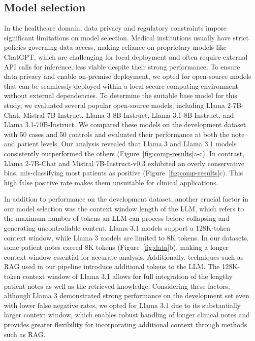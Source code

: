 \documentclass[fleqn,10pt]{wlscirep}
\begin{document}
\subsection*{Model selection}

In the healthcare domain, data privacy and regulatory constraints impose significant limitations on model selection. Medical institutions usually have strict policies governing data access, making reliance on proprietary models like ChatGPT, which are challenging for local deployment and often require external API calls for inference, less viable despite their strong performance. To ensure data privacy and enable on-premise deployment, we opted for open-source models that can be seamlessly deployed within a local secure computing environment without external dependencies. To determine the suitable base model for this study, we evaluated several popular open-source models, including Llama 2-7B-Chat,\cite{touvron2023llama} Mistral-7B-Instruct,\cite{Jiang2023Mistral7} Llama 3-8B-Instruct, Llama 3.1-8B-Instruct, and Llama 3.1-70B-Instruct.\cite{grattafiori2024llama} We compared these models on the development dataset with 50 cases and 50 controls and evaluated their performance at both the note and patient levels. Our analysis revealed that Llama 3 and Llama 3.1 models consistently outperformed the others (Figure~\ref{fig:comp-results}a-c). In contrast, Llama 2-7B-Chat and Mistral 7B-Instruct-v0.3 exhibited an overly conservative bias, mis-classifying most patients as positive (Figure~\ref{fig:comp-results}c). This high false positive rate makes them unsuitable for clinical applications.

In addition to performance on the development dataset, another crucial factor in our model selection was the context window length of the LLM, which refers to the maximum number of tokens an LLM can process before collapsing and generating uncontrollable content. Llama 3.1 models support a 128K-token context window, while Llama 3 models are limited to 8K tokens. In our datasets, some patient notes exceed 8K tokens (Figure~\ref{fig:data}b), making a longer context window essential for accurate analysis. Additionally, techniques such as RAG used in our pipeline introduce additional tokens to the LLM. The 128K-token context window of Llama 3.1 allows for full integration of the lengthy patient notes as well as the retrieved knowledge. Considering these factors, although Llama 3 demonstrated strong performance on the development set even with lower false negative rates, we opted for Llama 3.1 due to its substantially larger context window, which enables robust handling of longer clinical notes and provides greater flexibility for incorporating additional context through methods such as RAG.
\end{document}
